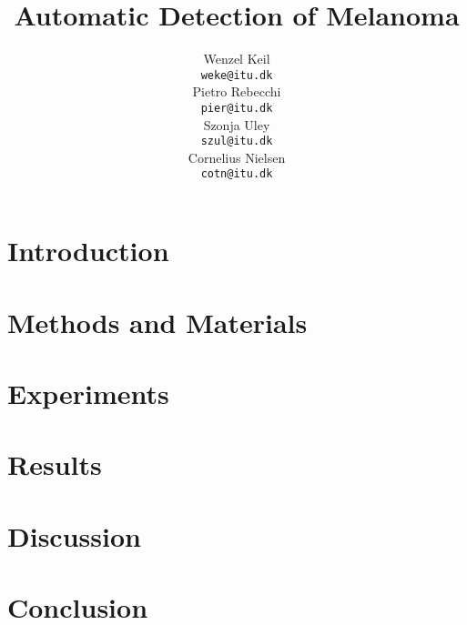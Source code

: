 \documentclass[11pt]{article}
\title{Automatic Detection of Melanoma}
\author{Wenzel Keil \\
  {\tt weke@itu.dk} \\\And
  Pietro Rebecchi \\
  {\tt pier@itu.dk} \\\And
  Szonja Uley \\
  {\tt szul@itu.dk} \\\And  
  Cornelius Nielsen \\
  {\tt cotn@itu.dk} \\}
\date{}
\begin{document}
\maketitle

\section{Introduction}


\section{Methods and Materials}


\section{Experiments}


\section{Results}


\section{Discussion}


\section{Conclusion}




\end{document}
